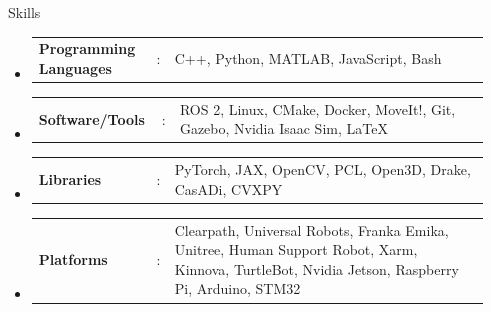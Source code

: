 \documentclass{resume}
\newcommand{\resumeHeadingListStart}{
  \begin{itemize}[leftmargin=0.15in, label={}]
    
}
\newcommand{\resumeHeadingListEnd}{\end{itemize}}
\newcommand{\resumeSectionType}[3]{
  \hspace{-1.3em}\item\begin{tabular*}{0.5\textwidth}[t]{
    p{0.25\linewidth}p{0.02\linewidth}p{0.67\linewidth}
  }
  \normalsize
    \textbf{#1} & #2 & {#3}
  \end{tabular*}\vspace{-8pt}
}
\begin{document}


\vspace{-0.5em}
\begin{rSection}{Skills}
\resumeHeadingListStart{}
\resumeSectionType{Programming Languages}{:}{C++, Python, MATLAB, JavaScript, Bash}
\resumeSectionType{Software/Tools}{:}{ROS 2, Linux, CMake, Docker, MoveIt!, Git, Gazebo, Nvidia Isaac Sim, \LaTeX}
\resumeSectionType{Libraries}{:}{PyTorch, JAX, OpenCV, PCL, Open3D, Drake, CasADi, CVXPY}
\resumeSectionType{Platforms}{:}{Clearpath, Universal Robots, Franka Emika, Unitree, Human Support Robot, Xarm, Kinnova, TurtleBot, Nvidia Jetson, Raspberry Pi, Arduino, STM32}
\resumeHeadingListEnd{}
\end{rSection}






\newpage
\thispagestyle{reference}
\end{document}
